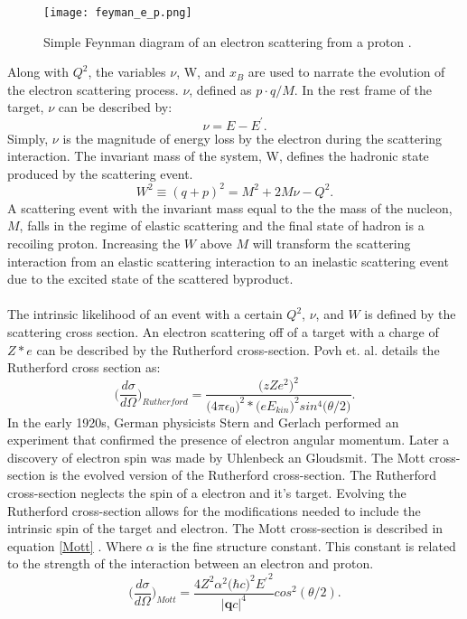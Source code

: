 \begin{figure}[h]
\centering
\caption{Simple Feynman diagram of an electron scattering from a proton \cite{Flay}.}
\texttt{[image: feyman\_e\_p.png]}
\label{feynman}
\end{figure}
Along with $Q^2$, the variables $\nu$, W, and $x_B$  are used to narrate the evolution of the electron scattering process. $\nu$, defined as $p\cdot q/M$. In the rest frame of the target,  $\nu$ can be described by:
\begin{equation}
\label{v}
\nu = E - E^\prime{}.
\end{equation}
Simply, $\nu$ is the magnitude of energy loss by the electron during the scattering interaction. The invariant mass of the system, W,  defines the hadronic state produced by the scattering event. 
\begin{equation}
\label{W}
W^2 \equiv (q + p)^2 = M^2 + 2M\nu -Q^2.
\end{equation}
A scattering event with the invariant mass equal to the the mass of the nucleon, $M$, falls in the regime of elastic scattering and the final state of hadron is a recoiling proton. Increasing the $W$ above $M$ will transform the scattering interaction from an elastic scattering interaction to an inelastic scattering event due to the excited state of the scattered byproduct. 
\paragraph{} The intrinsic likelihood of an event with a certain $Q^2$, $\nu$, and $W$ is defined by the scattering cross section. An electron scattering off of a target with a charge of $Z*e$ can be described by the Rutherford cross-section. Povh et. al. details the Rutherford cross section as:
\begin{equation}
\bigg(\frac{d\sigma}{d\Omega}\bigg)_{Rutherford} = \frac{ \big(zZe^2\big)^2} {\big( 4\pi \epsilon_0\big)^2 * \big(e E_{kin}\big)^2 sin^4\big( \theta / 2 \big) }. 
\end{equation}
  In the early 1920s, German physicists Stern and Gerlach performed an experiment that confirmed the presence of electron angular momentum. Later a discovery of electron spin was made by Uhlenbeck an Gloudsmit.   The Mott cross-section is the evolved version of the Rutherford cross-section. The Rutherford cross-section neglects the spin of a electron and it's target. Evolving the Rutherford cross-section allows for the modifications needed to include the intrinsic spin of the target and electron. The Mott cross-section is described in equation \ref{Mott} \cite{HighE,PnN}.  Where $\alpha$ is the fine structure constant. This constant is related to the strength of the interaction between an electron and proton\cite{sane}.
\begin{equation}
\bigg(\frac{d\sigma}{d\Omega}\bigg)_{Mott} = \frac{4Z^2\alpha^2 \big(\hbar c \big)^2 E{^{\prime} }^2}{ |\boldsymbol{q}c|^4} cos^2 (\theta/2). \label{Mott}
\end{equation}

